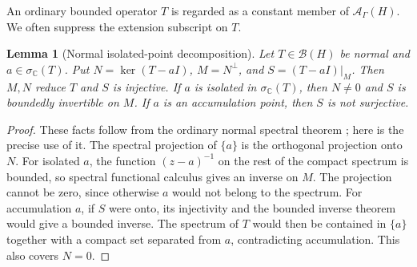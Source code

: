 \documentclass[11pt,a4paper]{article}
\numberwithin{equation}{section}
\newtheorem{lemma}[lemma]{Lemma}
\theoremstyle{definition}
\theoremstyle{remark}
\newcommand{\C}{\mathbb C}
\newcommand{\B}{\mathcal B(H)}
\newcommand{\Ahh}{\mathcal A_\Gamma(H)}
\begin{document}
An ordinary bounded operator $T$ is regarded as a constant member of
$\Ahh$. We often suppress the extension subscript on $T$.

\begin{lemma}[Normal isolated-point decomposition]\label{ihs:hh:lem:normalgap}
Let $T\in\B$ be normal and $a\in\sigma_\C(T)$. Put $N=\ker(T-aI)$,
$M=N^\perp$, and $S=(T-aI)|_M$. Then $M,N$ reduce $T$ and $S$ is injective.
If $a$ is isolated in $\sigma_\C(T)$, then $N\ne0$ and $S$ is boundedly
invertible on $M$. If $a$ is an accumulation point, then $S$ is not
surjective.
\end{lemma}
\begin{proof}
These facts follow from the ordinary normal spectral theorem
\cite{Douglas}; here is the precise use of it. The spectral projection of
$\{a\}$ is the orthogonal projection onto $N$. For isolated $a$, the
function $(z-a)^{-1}$ on the rest of the compact spectrum is bounded, so
spectral functional calculus gives an inverse on $M$. The projection cannot
be zero, since otherwise $a$ would not belong to the spectrum. For
accumulation $a$, if $S$ were onto, its injectivity and the bounded inverse
theorem would give a bounded inverse. The spectrum of $T$ would then be
contained in $\{a\}$ together with a compact set separated from $a$,
contradicting accumulation. This also covers $N=0$.
\end{proof}
\end{document}
